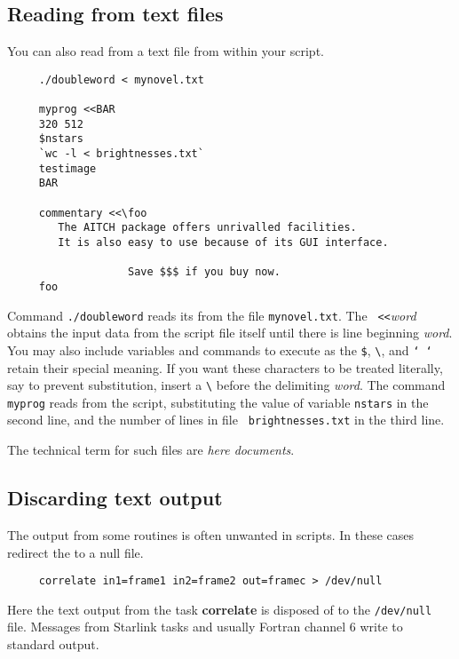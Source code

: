 \newpage
\subsection{Reading from text files
\label{sc4_se_reading_files}}

You can also read from a text file from within your script. 

\small
\begin{verbatim}
     ./doubleword < mynovel.txt

     myprog <<BAR
     320 512
     $nstars
     `wc -l < brightnesses.txt`
     testimage
     BAR

     commentary <<\foo
        The AITCH package offers unrivalled facilities.
        It is also easy to use because of its GUI interface.
        
                   Save $$$ if you buy now.
     foo
\end{verbatim}
\normalsize
Command {\tt ./doubleword} reads its  from the file {\tt mynovel.txt}.  The {\tt
<<}{\em word\/} obtains the input data from the script file itself
until there is line beginning {\em word}.  You may also include
variables and commands to execute as the {\tt \$},
\verb+\+, and {\tt `~`} retain their special meaning.  If you want these
characters to be treated literally, say to prevent substitution, insert
a \verb+\+ before the delimiting {\em word}.  The command {\tt myprog}
reads from the script, substituting the value of variable {\tt nstars}
in the second line, and the number of lines in file {\tt
brightnesses.txt} in the third line.

The technical term for such files are {\em here documents}.

\subsection{Discarding text output
\label{sc4_se_junk_output}}

The output from some routines is often unwanted in scripts.  In these
cases redirect the  to a
null file.

\small
\begin{verbatim}
     correlate in1=frame1 in2=frame2 out=framec > /dev/null
\end{verbatim}
\normalsize
Here the text output from the task {\bf correlate} is disposed of to
the {\tt /dev/null} file.  Messages from Starlink tasks and usually
Fortran channel 6 write to {\sf standard output}.

